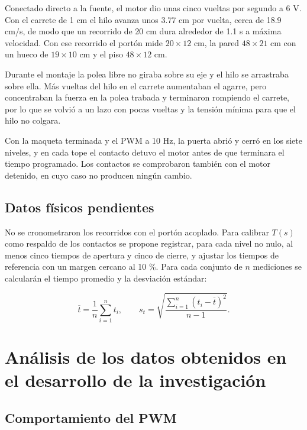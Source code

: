 \documentclass[12pt,letterpaper]{article}
\begin{document}
Conectado directo a la fuente, el motor dio unas cinco
vueltas por segundo a 6 V. Con el carrete de 1 cm el hilo
avanza unos 3.77 cm por vuelta, cerca de 18.9 cm/s, de
modo que un recorrido de 20 cm dura alrededor de 1.1 s a
máxima velocidad. Con ese recorrido el portón mide
$20\times12$ cm, la pared $48\times21$ cm con un hueco de
$19\times10$ cm y el piso $48\times12$ cm.

Durante el montaje la polea libre no giraba sobre su eje
y el hilo se arrastraba sobre ella. Más vueltas del hilo
en el carrete aumentaban el agarre, pero concentraban la
fuerza en la polea trabada y terminaron rompiendo el
carrete, por lo que se volvió a un lazo con pocas vueltas
y la tensión mínima para que el hilo no colgara.

Con la maqueta terminada y el PWM a 10 Hz, la puerta abrió
y cerró en los siete niveles, y en cada tope el contacto
detuvo el motor antes de que terminara el tiempo
programado. Los contactos se comprobaron también con el
motor detenido, en cuyo caso no producen ningún cambio.

\subsection{Datos físicos pendientes}

No se cronometraron los recorridos con el portón acoplado.
Para calibrar $T(s)$ como respaldo de los contactos se
propone registrar, para cada nivel no nulo, al menos
cinco tiempos de apertura y cinco de cierre, y ajustar
los tiempos de referencia con un margen cercano al 10 \%.
Para cada conjunto de $n$ mediciones se calcularán
el tiempo promedio y la desviación estándar:

\begin{equation}
\overline{t}=\frac{1}{n}\sum_{i=1}^{n}t_i,
\qquad
s_t=\sqrt{\frac{\sum_{i=1}^{n}(t_i-\overline{t})^2}{n-1}}.
\end{equation}


\section{Análisis de los datos obtenidos en el desarrollo
de la investigación}

\subsection{Comportamiento del PWM}
\end{document}
